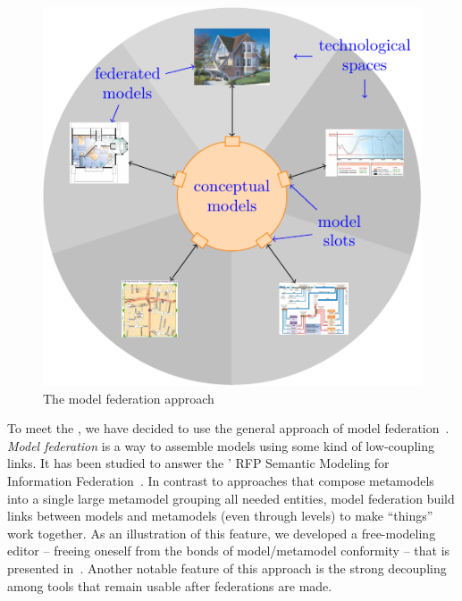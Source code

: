 

\begin{figure}[t]
    \centering
    \includegraphics[width=\columnwidth]{Figures/federation.pdf}
    \caption{The model federation approach}
    \label{fig:mf}
\end{figure}

To meet the \mlpc, we have decided to use the general
approach of model federation~\parencite{Golra2016-federation}. \emph{Model
  federation} is a way to assemble models using some kind of
low-coupling links. It has been studied to answer the \OMG' RFP
Semantic Modeling for Information Federation~\parencite{simf}. In
contrast to approaches that compose metamodels into a single large
metamodel grouping all needed entities, model federation build links
between models and metamodels (even through levels) to make ``things''
work together. As an illustration of this feature, we developed a
free-modeling editor -- freeing oneself from the bonds of
model/metamodel conformity -- that is presented
in~\parencite{models2016-freemodel}. Another notable feature of
this approach is the strong decoupling among tools that remain usable
after federations are made.

